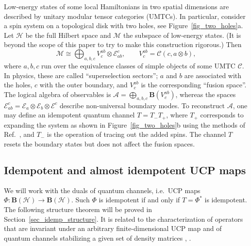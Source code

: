 \documentclass[12pt]{article}
\newcommand{\calA}{\mathcal{A}}
\newcommand{\calC}{\mathcal{C}}
\newcommand{\calE}{\mathcal{E}}
\newcommand{\calH}{\mathcal{H}}
\newcommand{\calM}{\mathcal{M}}
\newcommand{\Bo}{\mathbf{B}}
\newtheorem[definition]{Definition}[Theorem]{Definition}
\newtheorem[remark]{Example}[Theorem]{Example}
\newtheorem[remark]{Remark}[Theorem]{Remark}
\newtheorem[remark]{Question}[Theorem]{Open question}
\newtheorem*[definition]{definition}{Definition}
\newtheorem*[remark]{example}{Example}
\newtheorem*[remark]{remark}{Remark}
\newtheorem*[remark]{question}{Open question}
\numberwithin{equation}{section}
\begin{document}
\begin{example}
Low-energy states of some local Hamiltonians in two spatial dimensions are described by unitary modular tensor categories (UMTCs). In particular, consider a spin system on a topological disk with two holes, see Figure~\ref{fig_two_holes}a. Let $\calH$ be the full Hilbert space and $\calM$ the subspace of low-energy states. (It is beyond the scope of this paper to try to make this construction rigorous.) Then
\begin{equation}
\calM\cong \bigoplus_{a,b,c}V^{ab}_{c}\otimes\calE_{ab}^{c},\qquad
V^{ab}_{c}=\calC(c,a\otimes b),
\end{equation}
where $a,b,c$ run over the equivalence classes of simple objects of some UMTC $\calC$. In physics, these are called ``superselection sectors''; $a$ and $b$ are associated with the holes, $c$ with the outer boundary, and $V^{ab}_{c}$ is the corresponding ``fusion space''. The logical algebra of observables is $\calA=\bigoplus_{a,b,c}\Bo(V^{ab}_{c})$, whereas the spaces $\calE_{ab}^{c}=\calE_a\otimes\calE_b\otimes\calE^c$ describe non-universal boundary modes. To reconstruct $\calA$, one may define an idempotent quantum channel $T=T_{-}T_{+}$, where $T_{+}$ corresponds to expanding the system as shown in Figure~\ref{fig_two_holes}b using the methods of Ref.~\cite{SKK19}, and $T_{-}$ is the operation of tracing out the added spins. The channel $T$ resets the boundary states but does not affect the fusion spaces.
\end{example}

\subsection{Idempotent and almost idempotent UCP maps}\label{sec_ch_intro}

We will work with the duals of quantum channels, i.e.\ UCP maps $\Phi\colon\Bo(\calH)\to\Bo(\calH)$. Such $\Phi$ is idempotent if and only if $T=\Phi^*$ is idempotent. The following structure theorem will be proved in Section~\ref{sec_idemp_structure}. It is related to the characterization of operators that are invariant under an arbitrary finite-dimensional UCP map \cite[Theorems~6.12 and Lemma~6.4]{Wolf} and of quantum channels stabilizing a given set of density matrices \cite{KoIm01}, \cite[Theorem~10]{HJPW03}.
\end{document}
